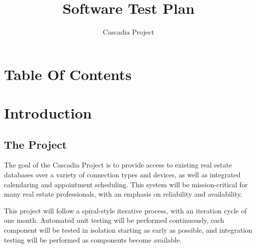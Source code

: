 \documentclass[11pt]{wacomepd}
\begin{document}
\date{Cascadia Project} 
\title{Software Test Plan} 
\maketitle


\chapter{Table Of Contents}
\tableofcontents
\clearpage


\chapter{Introduction}


\section{The Project}
The goal of the Cascadia Project is to provide access to existing real estate databases over a
variety of connection types and devices, as well as integrated calendaring and appointment
scheduling.  This system will be mission-critical for many real estate professionals, with an
emphasis on reliability and availability.

This project will follow a spiral-style iterative process, with an iteration cycle of one month.
Automated unit testing will be performed continuously, each component will be tested in isolation
starting as early as possible, and integration testing will be performed as components become
available.
\end{document}
